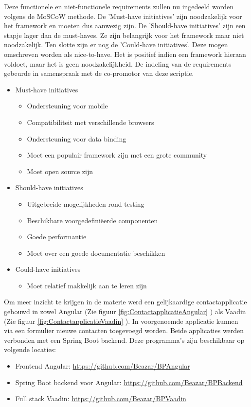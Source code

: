 Deze functionele en niet-functionele requirements zullen nu ingedeeld worden volgens de MoSCoW methode.\autocite{ProductPlan2019}
De 'Must-have initiatives' zijn noodzakelijk voor het framework en moeten dus aanwezig zijn.
De 'Should-have initiatives' zijn een stapje lager dan de must-haves. Ze zijn belangrijk voor het framework maar niet noodzakelijk.
Ten slotte zijn er nog de 'Could-have initiatives'. Deze mogen omschreven worden als nice-to-have. Het is positief indien een framework hieraan voldoet, maar het is geen noodzakelijkheid.
De indeling van de requirements gebeurde in samenspraak met de co-promotor van deze scriptie.

\begin{itemize}
	\item  Must-have initiatives
	\begin{itemize}
	\item Ondersteuning voor mobile
	\item Compatibiliteit met verschillende browsers
	\item Ondersteuning voor data binding
	\item Moet een populair framework zijn met een grote community
	\item Moet open source zijn	 
	\end{itemize}
	\item Should-have initiatives
	\begin{itemize}
	\item Uitgebreide mogelijkheden rond testing
	\item Beschikbare voorgedefiniëerde componenten 
	\item Goede performantie
	\item Moet over een goede documentatie beschikken
	\end{itemize}
		\item Could-have initiatives
		\begin{itemize}
	\item Moet relatief makkelijk aan te leren zijn
		\end{itemize}
\end{itemize}

Om meer inzicht te krijgen in de materie werd een gelijkaardige contactapplicatie gebouwd in zowel Angular (Zie figuur \ref{fig:ContactapplicatieAngular} ) als Vaadin (Zie figuur \ref{fig:ContactapplicatieVaadin} ). In voorgenoemde applicatie kunnen via een formulier nieuwe contacten toegevoegd worden. Beide applicaties werden verbonden met een Spring Boot backend. Deze programma's zijn beschikbaar op volgende locaties:
\begin{itemize}
	\item Frontend Angular: \url{https://github.com/Beazar/BPAngular}
	\item Spring Boot backend voor Angular: \url{https://github.com/Beazar/BPBackend}
	\item Full stack Vaadin: \url{https://github.com/Beazar/BPVaadin}
\end{itemize}

